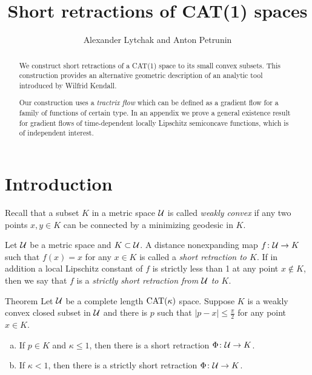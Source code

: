 \documentclass[oneside,a4paper, 12pt]{article}
\begin{document}
\title{Short retractions of CAT(1) spaces}
\author{Alexander Lytchak and Anton Petrunin}
\date{}
\maketitle

\begin{abstract}
We construct short retractions of a CAT(1) space to its small convex subsets.
This construction provides an alternative geometric description of an analytic tool introduced by Wilfrid Kendall.

Our construction uses a \emph{tractrix flow} which can be defined as a gradient flow for a family of functions of certain type.
In an appendix we prove a general existence result for gradient flows of time-dependent locally Lipschitz semiconcave functions, which is of independent interest.
\end{abstract}

\section{Introduction}

Recall that a  subset $K$ in a metric space ${\mathcal{U}}$ is called \emph{weakly convex} if any two points $x,y\in K$ can be connected by a minimizing geodesic in $K$.

Let ${\mathcal{U}}$ be a metric space and $K\subset {\mathcal{U}}$.
A distance nonexpanding map $f\colon{\mathcal{U}}\to K$ such that $f(x)=x$ for any $x\in K$ is called a \emph{short retraction to $K$}.
If in addition a local Lipschitz constant of $f$ is strictly less than 1 at any point $x\notin K$, 
then we say that $f$ is a \emph{strictly short retraction from ${\mathcal{U}}$ to $K$}.

\begin{thm}{Theorem}\label{thm:retraction:Phi}
Let $\mathcal{U}$ be a complete length $\mathrm{CAT}(\kappa)$ space.
Suppose $K$ is a weakly convex closed subset in $\mathcal{U}$ and there is $p$ such that $|p-x|\le \tfrac\pi2$ for any point $x\in K$.


\begin{enumerate}[(a)]
 \item If $p\in K$ and $\kappa\le 1$, then there is a short retraction 
$\Phi\colon\mathcal{U}\to K$.
\item If $\kappa<1$, then there is a strictly short retraction 
$\Phi\colon\mathcal{U}\to K$.
\end{enumerate}
\end{thm}
\end{document}

